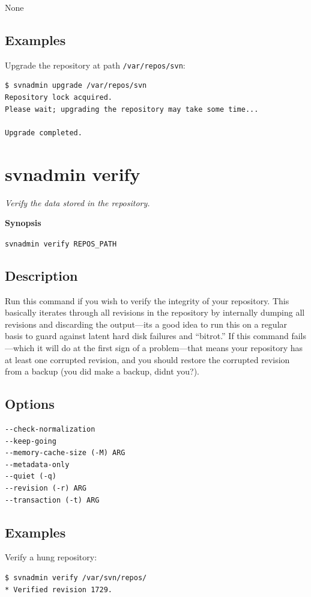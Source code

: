 None

\subsection{Examples}

Upgrade the repository at path \texttt{/var/repos/svn}:

\begin{verbatim}
$ svnadmin upgrade /var/repos/svn
Repository lock acquired.
Please wait; upgrading the repository may take some time...

Upgrade completed.
\end{verbatim}

\section{svnadmin verify}\label{svn.ref.svnadmin.c.verify}

\emph{Verify the data stored in the repository.}

\textbf{Synopsis}

\texttt{svnadmin\ verify\ REPOS\_PATH}

\subsection{Description}

Run this command if you wish to verify the integrity of your repository.
This basically iterates through all revisions in the repository by
internally dumping all revisions and discarding the
output---it\textquotesingle s a good idea to run this on a regular basis
to guard against latent hard disk failures and ``bitrot.'' If this
command fails---which it will do at the first sign of a problem---that
means your repository has at least one corrupted revision, and you
should restore the corrupted revision from a backup (you did make a
backup, didn\textquotesingle t you?).

\subsection{Options}

\begin{verbatim}
--check-normalization
--keep-going
--memory-cache-size (-M) ARG
--metadata-only
--quiet (-q)
--revision (-r) ARG
--transaction (-t) ARG
\end{verbatim}

\subsection{Examples}

Verify a hung repository:

\begin{verbatim}
$ svnadmin verify /var/svn/repos/ 
* Verified revision 1729.
\end{verbatim}

